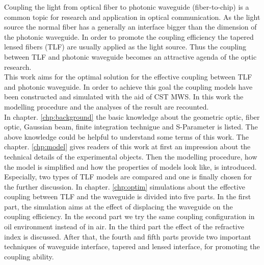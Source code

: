 
Coupling the light from optical fiber to photonic waveguide (fiber-to-chip) is a common topic for research and application in optical communication. As the light source the normal fiber has a generally an interface bigger than the dimension of the photonic waveguide. In order to promote the coupling efficiency the tapered lensed fibers (TLF) are usually applied as the light source. Thus the coupling between TLF and photonic waveguide becomes an attractive agenda of the optic research. \\ 

This work aims for the optimal solution for the effective coupling between TLF and photonic waveguide. In order to achieve this goal the coupling models have been constructed and simulated with the aid of CST MWS. In this work the modelling procedure and the analyses of the result are recounted.\\

In chapter. \ref{chp:background} the basic knowledge about the geometric optic, fiber optic, Gaussian beam, finite integration technigue and S-Parameter is listed. The above knowledge could be helpful to understand some terms of this work. The chapter. \ref{chp:model} gives readers of this work at first an impression about the technical details of the experimental objects. Then the modelling procedure, how the model is simplified and how the properties of models look like, is introduced. Especially, two types of TLF models are compared and one is finally chosen for the further discussion. In chapter. \ref{chp:optim} simulations about the effective coupling between TLF and the waveguide is divided into five parts. In the first part, the simulation aims at the effect of displacing the waveguide on the coupling efficiency. In the second part we try the same coupling configuration in oil environment instead of in air. In the third part the effect of the refractive index is discussed. After that, the fourth and fifth parts provide two important techniques of waveguide interface, tapered and lensed interface, for promoting the coupling ability.\\        
 
